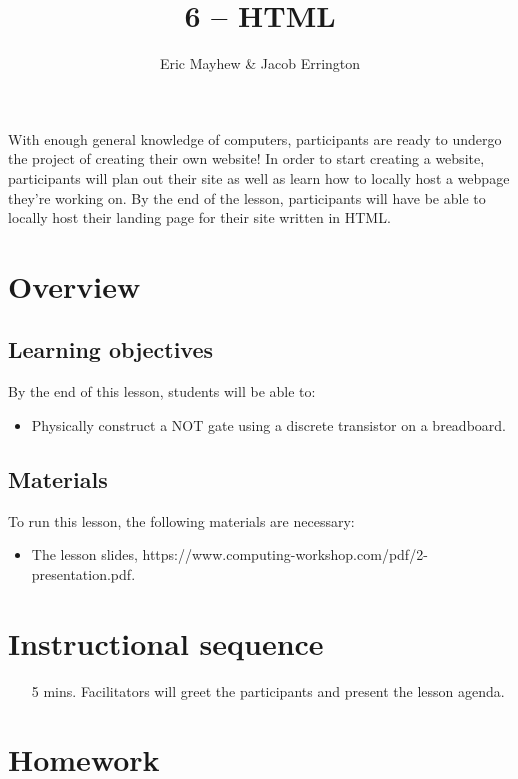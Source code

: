 \documentclass[11pt]{article}
\title{6 -- HTML}
\author{Eric Mayhew \& Jacob Errington}
\date{}
\newcommand{\cwurl}{https://www.computing-workshop.com/}
\newcommand{\cwpdf}{\cwurl pdf/}
\begin{document}
\maketitle

With enough general knowledge of computers, participants are ready to undergo
the project of creating their own website! In order to start creating a website,
participants will plan out their site as well as learn how to locally host a
webpage they're working on. By the end of the lesson, participants will have be
able to locally host their landing page for their site written in HTML.

\section*{Overview}

\subsection*{Learning objectives}

By the end of this lesson, students will be able to:
%
\begin{itemize}
\item Physically construct a NOT gate using a discrete transistor on a breadboard.
\end{itemize}

\subsection*{Materials}

To run this lesson, the following materials are necessary:

\begin{itemize}
\item The lesson slides, \cwpdf{2-presentation.pdf}.
\end{itemize}

\section*{Instructional sequence}

\begin{itemize}
\item[5 mins.]
  Facilitators will greet the participants and present the lesson agenda.
\end{itemize}

\section*{Homework}
\end{document}
